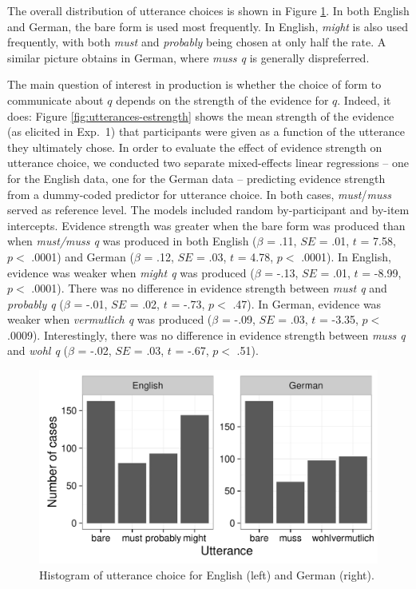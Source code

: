 \documentclass[11pt]{article}
\newcommand{\figref}[1]{Figure \ref{#1}}
\begin{document}
The overall distribution of utterance choices is shown in \figref{fig:utterances}. In both English and German, the bare form is used most frequently. In English, \emph{might} is also used frequently, with both \emph{must} and \emph{probably} being chosen at only half the rate. A similar picture obtains in German, where \emph{muss q} is generally dispreferred.

The main question of interest in production is whether the choice of form to communicate about $q$ depends on the strength of the evidence for $q$. Indeed, it does: \figref{fig:utterances-estrength} shows the mean strength of the evidence (as elicited in Exp.~1) that participants were given as a function of the utterance they ultimately chose.   In order to evaluate the effect of evidence strength on utterance choice, we conducted two separate mixed-effects linear regressions -- one for the English data, one for the German data -- predicting evidence strength from a dummy-coded predictor for utterance choice. In both cases, \emph{must}/\emph{muss} served as reference level. The models included random by-participant and by-item  intercepts. Evidence strength was greater when the bare form was produced than when \emph{must/muss q} was produced in both English ($\beta$ = .11, $SE$ = .01, $t$ = 7.58, $p <$ .0001) and German ($\beta$ = .12, $SE$ = .03, $t$ = 4.78, $p <$ .0001). In English, evidence   was weaker  when \emph{might q} was produced  ($\beta$ = -.13, $SE$ = .01, $t$ = -8.99, $p <$ .0001). There was no difference in evidence strength between \emph{must q} and \emph{probably q}  ($\beta$ = -.01, $SE$ = .02, $t$ = -.73, $p <$ .47). In German, evidence was weaker when \emph{vermutlich q} was produced  ($\beta$ = -.09, $SE$ = .03, $t$ = -3.35, $p <$ .0009). Interestingly, there was no difference in evidence strength between \emph{muss q} and \emph{wohl q}  ($\beta$ = -.02, $SE$ = .03, $t$ = -.67, $p <$ .51).

\begin{figure}
\centering
\includegraphics[width=.9\textwidth]{pics/production-distribution}
\caption{Histogram of utterance choice for English (left) and German (right).}
\label{fig:utterances}
\end{figure}
\end{document}
